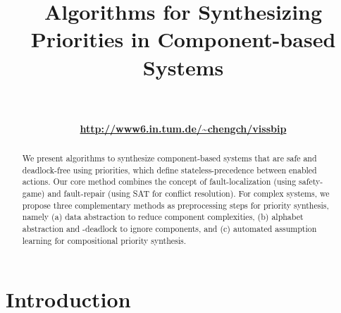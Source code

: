 \documentclass[10pt, a4paper, onecolumn, conference, compsocconf]{IEEEtran}
\begin{document}
\title{Algorithms for Synthesizing Priorities in Component-based Systems}



\author{
                    \\
\\

\textbf{\url{http://www6.in.tum.de/~chengch/vissbip}}
}





\maketitle

\begin{abstract}
We present algorithms to synthesize component-based systems
that are safe and deadlock-free using priorities, which define stateless-precedence
between enabled actions. Our core method combines the concept of fault-localization (using safety-game) and fault-repair (using SAT for conflict resolution). For complex systems, we propose three complementary methods as preprocessing steps for priority synthesis, namely (a) data abstraction to reduce component complexities, (b) alphabet abstraction and -deadlock to ignore components, and (c) automated assumption learning for compositional priority synthesis.

\end{abstract}




\IEEEpeerreviewmaketitle

\section{Introduction\label{sec.algo.prioritysyn.introduction}}
\end{document}
